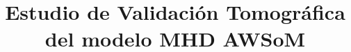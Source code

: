 \documentclass[craaa]{baaa}
\begin{document}


\title{Estudio de Validación Tomográfica del modelo MHD AWSoM}

\end{document}
